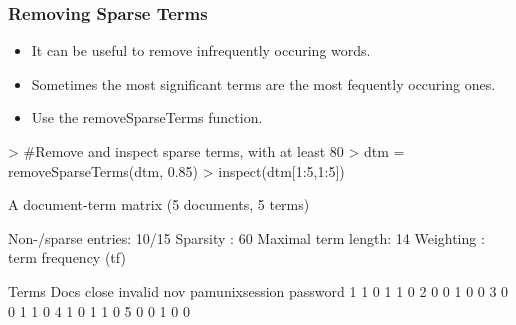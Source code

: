 \documentclass[compress,8pt]{beamer}
\begin{document}
\begin{frame}
\frametitle{Removing Sparse Terms}    
\begin{itemize}
\item It can be useful to remove infrequently occuring words.
\item Sometimes the most significant terms are the most fequently occuring ones.
\item Use the removeSparseTerms function. 
\end{itemize}  
\begin{Schunk}
\begin{Sinput}
> #Remove and inspect sparse terms, with at least 80% sparse occurence
> dtm = removeSparseTerms(dtm, 0.85)
> inspect(dtm[1:5,1:5])
\end{Sinput}
A document-term matrix (5 documents, 5 terms)

Non-/sparse entries: 10/15
Sparsity           : 60%
Maximal term length: 14 
Weighting          : term frequency (tf)

    Terms
Docs close invalid nov pamunixsession password
   1     1       0   1              1        0
   2     0       0   1              0        0
   3     0       0   1              1        0
   4     1       0   1              1        0
   5     0       0   1              0        0\end{Schunk}
\end{frame}
\end{document}
